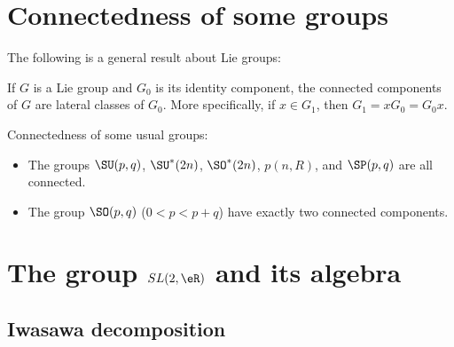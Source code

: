 
\section{Connectedness of some groups}

The following is a general result about Lie groups:
\begin{lemma} \label{LemConnSpecMo}
If $G$ is a Lie group and $G_0$ is its identity component, the connected components of $G$ are lateral classes of $G_0$. More specifically, if $x\in G_1$, then $G_1=xG_0=G_0x$.
\end{lemma}

\begin{lemma}   \label{LemOHjzfsL}
Connectedness of some usual groups:
\begin{itemize}
\item 
    The groups $\SU(p, q)$, $\SU^*(2n)$, $\SO^*(2n)$, $p(n, R)$, and $\SP(p, q)$ are
all connected.
\item 
    The group $\SO(p, q)$ ($0<p<p+q$) have exactly two connected components.
\end{itemize}
\end{lemma}

\section{The group \texorpdfstring{$SL(2,\eR)$}{SL2R} and its algebra}	\label{SecToolSL}

\subsection{Iwasawa decomposition}

